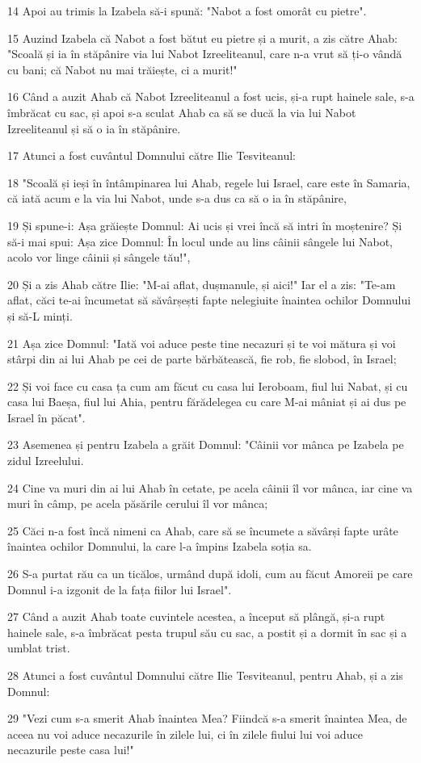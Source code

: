 \par 14 Apoi au trimis la Izabela să-i spună: "Nabot a fost omorât cu pietre".
\par 15 Auzind Izabela că Nabot a fost bătut eu pietre și a murit, a zis către Ahab: "Scoală și ia în stăpânire via lui Nabot Izreeliteanul, care n-a vrut să ți-o vândă cu bani; că Nabot nu mai trăiește, ci a murit!"
\par 16 Când a auzit Ahab că Nabot Izreeliteanul a fost ucis, și-a rupt hainele sale, s-a îmbrăcat cu sac, și apoi s-a sculat Ahab ca să se ducă la via lui Nabot Izreeliteanul și să o ia în stăpânire.
\par 17 Atunci a fost cuvântul Domnului către Ilie Tesviteanul:
\par 18 "Scoală și ieși în întâmpinarea lui Ahab, regele lui Israel, care este în Samaria, că iată acum e la via lui Nabot, unde s-a dus ca să o ia în stăpânire,
\par 19 Și spune-i: Așa grăiește Domnul: Ai ucis și vrei încă să intri în moștenire? Și să-i mai spui: Așa zice Domnul: În locul unde au lins câinii sângele lui Nabot, acolo vor linge câinii și sângele tău!",
\par 20 Și a zis Ahab către Ilie: "M-ai aflat, dușmanule, și aici!" Iar el a zis: "Te-am aflat, căci te-ai încumetat să săvârșești fapte nelegiuite înaintea ochilor Domnului și să-L minți.
\par 21 Așa zice Domnul: "Iată voi aduce peste tine necazuri și te voi mătura și voi stârpi din ai lui Ahab pe cei de parte bărbătească, fie rob, fie slobod, în Israel;
\par 22 Și voi face cu casa ța cum am făcut cu casa lui Ieroboam, fiul lui Nabat, și cu casa lui Baeșa, fiul lui Ahia, pentru fărădelegea cu care M-ai mâniat și ai dus pe Israel în păcat".
\par 23 Asemenea și pentru Izabela a grăit Domnul: "Câinii vor mânca pe Izabela pe zidul Izreelului.
\par 24 Cine va muri din ai lui Ahab în cetate, pe acela câinii îl vor mânca, iar cine va muri în câmp, pe acela păsările cerului îl vor mânca;
\par 25 Căci n-a fost încă nimeni ca Ahab, care să se încumete a săvârși fapte urâte înaintea ochilor Domnului, la care l-a împins Izabela soția sa.
\par 26 S-a purtat rău ca un ticălos, urmând după idoli, cum au făcut Amoreii pe care Domnul i-a izgonit de la fața fiilor lui Israel".
\par 27 Când a auzit Ahab toate cuvintele acestea, a început să plângă, și-a rupt hainele sale, s-a îmbrăcat pesta trupul său cu sac, a postit și a dormit în sac și a umblat trist.
\par 28 Atunci a fost cuvântul Domnului către Ilie Tesviteanul, pentru Ahab, și a zis Domnul:
\par 29 "Vezi cum s-a smerit Ahab înaintea Mea? Fiindcă s-a smerit înaintea Mea, de aceea nu voi aduce necazurile în zilele lui, ci în zilele fiului lui voi aduce necazurile peste casa lui!"

